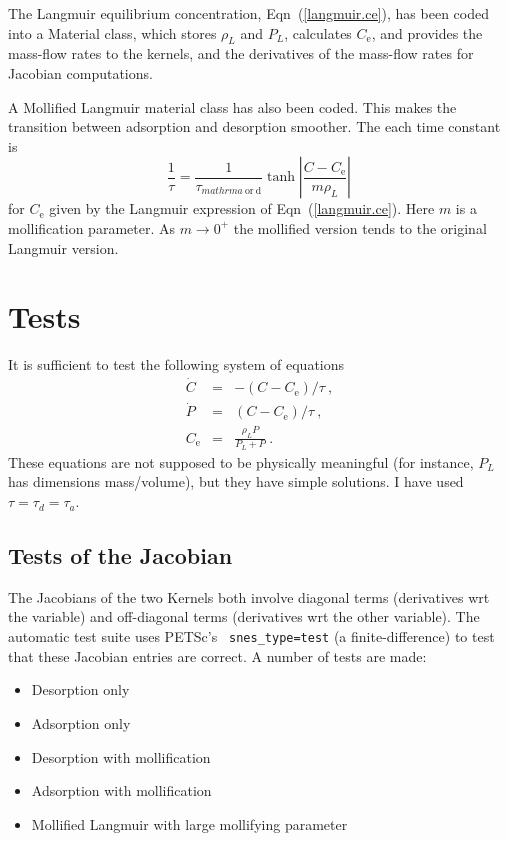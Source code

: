 \documentclass[]{scrreprt}
\begin{document}
The Langmuir equilibrium concentration, Eqn~(\ref{langmuir.ce}), has
been coded into a Material class, which stores $\rho_{L}$ and $P_{L}$,
calculates $C_{\mathrm{e}}$, and provides the mass-flow rates to the
kernels, and the derivatives of the mass-flow rates for Jacobian
computations.

A Mollified Langmuir material class has also been coded.  This makes
the transition between adsorption and desorption smoother.  The each
time constant is
\begin{equation}
\frac{1}{\tau} = \frac{1}{\tau_{mathrm{a}\ \mathrm{or}\ \mathrm{d}}}
\tanh \left| \frac{C-C_{\mathrm{e}}}{m\rho_{L}}\right| \,
\end{equation}
for $C_{\mathrm{e}}$ given by the Langmuir expression of
Eqn~(\ref{langmuir.ce}).  
Here $m$ is a mollification parameter.  As $m \rightarrow 0^{+}$ the
mollified version tends to the original Langmuir version.



\chapter{Tests}

It is sufficient to test the following system of equations
\begin{eqnarray}
\dot{C} & = & -(C-C_{\mathrm{e}})/\tau \ , \nonumber \\
\dot{P} & = & (C-C_{\mathrm{e}})/\tau \ , \nonumber \\
C_{\mathrm{e}} & = & \frac{\rho_{L}P}{P_{L}+P} \ .
\label{test.eqns}
\end{eqnarray}
These equations are not supposed to be physically meaningful (for
instance, $P_{L}$ has dimensions mass/volume), but they have simple
solutions.  I have used $\tau = \tau_{d} = \tau_{a}$.

\section{Tests of the Jacobian}

The Jacobians of the two Kernels both involve diagonal terms
(derivatives wrt the variable) and off-diagonal terms (derivatives wrt
the other variable).  The automatic test suite uses PETSc's {\tt
  snes\_type=test} (a finite-difference) to test that these Jacobian
entries are correct.  A number of tests are made:
\begin{itemize}
\item Desorption only
\item Adsorption only
\item Desorption with mollification
\item Adsorption with mollification
\item Mollified Langmuir with large mollifying parameter
\end{itemize}
\end{document}
